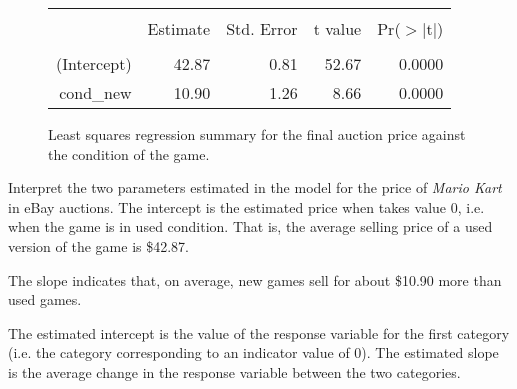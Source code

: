 \begin{figure}
\centering
\begin{tabular}{rrrrr}
  \hline
  \vspace{-3.7mm} & & & & \\
 & Estimate & Std. Error & t value & Pr($>$$|$t$|$) \\ 
  \hline
  \vspace{-3.6mm} & & & & \\
(Intercept) & 42.87 & 0.81 & 52.67 & 0.0000 \\ 
  cond\_\hspace{0.3mm}new & 10.90 & 1.26 & 8.66 & 0.0000 \\ 
   \hline
\end{tabular}
\caption{Least squares regression summary for the final auction price against the condition of the game.}
\label{marioKartNewUsedRegrSummary}
\end{figure}

\begin{example}{Interpret the two parameters estimated in the model for the price of \emph{Mario Kart} in eBay auctions.}
The intercept is the estimated price when  takes value 0, i.e. when the game is in used condition. That is, the average selling price of a used version of the game is \$42.87.

The slope indicates that, on average, new games sell for about \$10.90 more than used games.
\end{example}

\begin{tipBox}{
The estimated intercept is the value of the response variable for the first category (i.e. the category corresponding to an indicator value of 0). The estimated slope is the average change in the response variable between the two categories.}
\end{tipBox}





